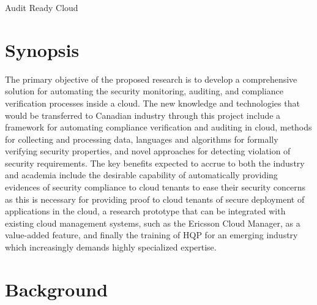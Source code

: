 \documentclass[12pt]{article}
\begin{document}
\begin{center}
{\Huge Audit Ready Cloud}
\end{center}

\thispagestyle{empty}







\section{Synopsis}
\label{sec:syn}
\vspace{-3mm} 

The primary objective of the proposed research is to develop a
comprehensive solution for automating the security monitoring,
auditing, and compliance verification processes inside a cloud. The
new knowledge and technologies that would be transferred to Canadian
industry through this project include a framework for automating
compliance verification and auditing in cloud, methods for collecting
and processing data, languages and algorithms for formally verifying
security properties, and novel approaches for detecting violation of
security requirements. The key benefits expected to accrue to both the
industry and academia include the desirable capability of
automatically providing evidences of security compliance to cloud
tenants to ease their security concerns as this is necessary for
providing proof to cloud tenants of secure deployment of
applications in the cloud, a research prototype that can be integrated
with existing cloud management systems, such as the Ericsson Cloud
Manager, as a value-added feature, and finally the training of HQP for
an emerging industry which increasingly demands highly specialized
expertise.

\vspace{-5mm} 
\section{Background}
\label{sec:bac}
\vspace{-3mm} 
\end{document}
